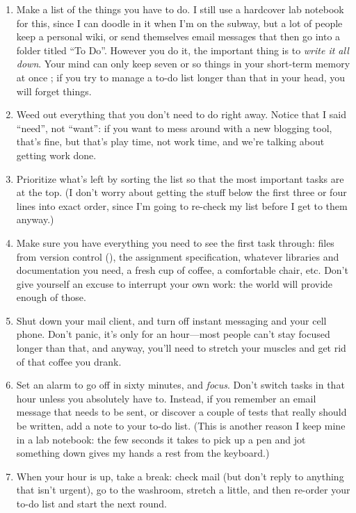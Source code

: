 \documentclass{report}
\begin{document}
\begin{enumerate}

  \item Make a list of the things you have to do.  I still use a
  hardcover lab notebook for this, since I can doodle in it when I'm
  on the subway, but a lot of people keep a personal wiki, or send
  themselves email messages that then go into a folder titled ``To
  Do''.  However you do it, the important thing is to \emph{write it
  all down}.  Your mind can only keep seven or so things in your
  short-term memory at once \cite{b:hock-forty-studies}; if you try to
  manage a to-do list longer than that in your head, you will forget
  things.

  \item Weed out everything that you don't need to do right away.
  Notice that I said ``need'', not ``want'': if you want to mess
  around with a new blogging tool, that's fine, but that's play time,
  not work time, and we're talking about getting work done.

  \item Prioritize what's left by sorting the list so that the most
  important tasks are at the top.  (I don't worry about getting the
  stuff below the first three or four lines into exact order, since
  I'm going to re-check my list before I get to them anyway.)

  \item Make sure you have everything you need to see the first task
  through: files from version control (),
  the assignment specification, whatever libraries and documentation
  you need, a fresh cup of coffee, a comfortable chair, etc.  Don't
  give yourself an excuse to interrupt your own work: the world will
  provide enough of those.

  \item Shut down your mail client, and turn off instant messaging and
  your cell phone.  Don't panic, it's only for an hour---most people
  can't stay focused longer than that, and anyway, you'll need to
  stretch your muscles and get rid of that coffee you drank.

  \item Set an alarm to go off in sixty minutes, and \emph{focus}.
  Don't switch tasks in that hour unless you absolutely have to.
  Instead, if you remember an email message that needs to be sent, or
  discover a couple of tests that really should be written, add a note
  to your to-do list.  (This is another reason I keep mine in a lab
  notebook: the few seconds it takes to pick up a pen and jot
  something down gives my hands a rest from the keyboard.)

  \item When your hour is up, take a break: check mail (but don't
  reply to anything that isn't urgent), go to the washroom, stretch a
  little, and then re-order your to-do list and start the next round.

\end{enumerate}
\end{document}
